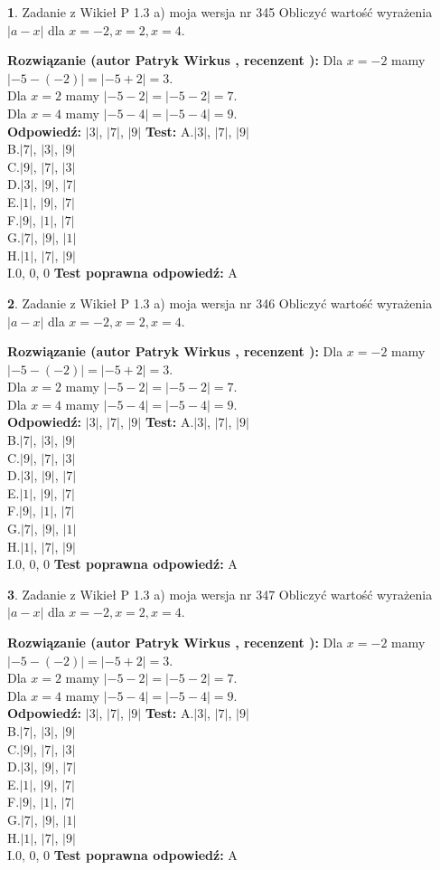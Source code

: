 \documentclass[12pt, a4paper]{article}
\theoremstyle{definition} %
\newtheorem{zad}{}
\newcommand{\zadStart}[1]{\begin{zad}#1\newline}
\newcommand{\zadStop}{\end{zad}}
\newcommand{\rozwStart}[2]{\noindent \textbf{Rozwiązanie (autor #1 , recenzent #2): }\newline}
\newcommand{\rozwStop}{\newline}
\newcommand{\odpStart}{\noindent \textbf{Odpowiedź:}\newline}
\newcommand{\odpStop}{\newline}
\newcommand{\testStart}{\noindent \textbf{Test:}\newline}
\newcommand{\testStop}{\newline}
\newcommand{\kluczStart}{\noindent \textbf{Test poprawna odpowiedź:}\newline}
\newcommand{\kluczStop}{\newline}
\begin{document}
\zadStart{Zadanie z Wikieł P 1.3 a) moja wersja nr 345}
Obliczyć wartość wyrażenia $|a - x|$ dla $x=-2,x=2,x=4$.
\zadStop
\rozwStart{Patryk Wirkus}{}
Dla $x = -2$ mamy $|-5 - (-2)| = |-5 + 2| = 3$.\\
Dla $x = 2$ mamy $|-5 - 2| = |-5 - 2| = 7$.\\
Dla $x = 4$ mamy $|-5 - 4| = |-5 - 4| = 9$.\\
\rozwStop
\odpStart
$|3|$, $|7|$, $|9|$
\odpStop
\testStart
A.$|3|$, $|7|$, $|9|$\\
B.$|7|$, $|3|$, $|9|$\\
C.$|9|$, $|7|$, $|3|$\\
D.$|3|$, $|9|$, $|7|$\\
E.$|1|$, $|9|$, $|7|$\\
F.$|9|$, $|1|$, $|7|$\\
G.$|7|$, $|9|$, $|1|$\\
H.$|1|$, $|7|$, $|9|$\\
I.$0$, $0$, $0$
\testStop
\kluczStart
A
\kluczStop



\zadStart{Zadanie z Wikieł P 1.3 a) moja wersja nr 346}
Obliczyć wartość wyrażenia $|a - x|$ dla $x=-2,x=2,x=4$.
\zadStop
\rozwStart{Patryk Wirkus}{}
Dla $x = -2$ mamy $|-5 - (-2)| = |-5 + 2| = 3$.\\
Dla $x = 2$ mamy $|-5 - 2| = |-5 - 2| = 7$.\\
Dla $x = 4$ mamy $|-5 - 4| = |-5 - 4| = 9$.\\
\rozwStop
\odpStart
$|3|$, $|7|$, $|9|$
\odpStop
\testStart
A.$|3|$, $|7|$, $|9|$\\
B.$|7|$, $|3|$, $|9|$\\
C.$|9|$, $|7|$, $|3|$\\
D.$|3|$, $|9|$, $|7|$\\
E.$|1|$, $|9|$, $|7|$\\
F.$|9|$, $|1|$, $|7|$\\
G.$|7|$, $|9|$, $|1|$\\
H.$|1|$, $|7|$, $|9|$\\
I.$0$, $0$, $0$
\testStop
\kluczStart
A
\kluczStop



\zadStart{Zadanie z Wikieł P 1.3 a) moja wersja nr 347}
Obliczyć wartość wyrażenia $|a - x|$ dla $x=-2,x=2,x=4$.
\zadStop
\rozwStart{Patryk Wirkus}{}
Dla $x = -2$ mamy $|-5 - (-2)| = |-5 + 2| = 3$.\\
Dla $x = 2$ mamy $|-5 - 2| = |-5 - 2| = 7$.\\
Dla $x = 4$ mamy $|-5 - 4| = |-5 - 4| = 9$.\\
\rozwStop
\odpStart
$|3|$, $|7|$, $|9|$
\odpStop
\testStart
A.$|3|$, $|7|$, $|9|$\\
B.$|7|$, $|3|$, $|9|$\\
C.$|9|$, $|7|$, $|3|$\\
D.$|3|$, $|9|$, $|7|$\\
E.$|1|$, $|9|$, $|7|$\\
F.$|9|$, $|1|$, $|7|$\\
G.$|7|$, $|9|$, $|1|$\\
H.$|1|$, $|7|$, $|9|$\\
I.$0$, $0$, $0$
\testStop
\kluczStart
A
\kluczStop
\end{document}
